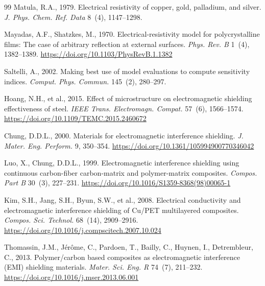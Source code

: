 \documentclass[review,3p,authoryear]{elsarticle}
\begin{document}
\begin{thebibliography}{99}
Matula, R.A., 1979.
Electrical resistivity of copper, gold, palladium, and silver.
\textit{J. Phys. Chem. Ref. Data} 8~(4), 1147--1298.

Mayadas, A.F., Shatzkes, M., 1970.
Electrical-resistivity model for polycrystalline films: The case of arbitrary reflection at external surfaces.
\textit{Phys. Rev. B} 1~(4), 1382--1389.
\url{https://doi.org/10.1103/PhysRevB.1.1382}

Saltelli, A., 2002.
Making best use of model evaluations to compute sensitivity indices.
\textit{Comput. Phys. Commun.} 145~(2), 280--297.

Hoang, N.H., et al., 2015.
Effect of microstructure on electromagnetic shielding effectiveness of steel.
\textit{IEEE Trans. Electromagn. Compat.} 57~(6), 1566--1574.
\url{https://doi.org/10.1109/TEMC.2015.2460672}

Chung, D.D.L., 2000.
Materials for electromagnetic interference shielding.
\textit{J. Mater. Eng. Perform.} 9, 350--354.
\url{https://doi.org/10.1361/105994900770346042}

Luo, X., Chung, D.D.L., 1999.
Electromagnetic interference shielding using continuous carbon-fiber carbon-matrix and polymer-matrix composites.
\textit{Compos. Part B} 30~(3), 227--231.
\url{https://doi.org/10.1016/S1359-8368(98)00065-1}

Kim, S.H., Jang, S.H., Byun, S.W., et al., 2008.
Electrical conductivity and electromagnetic interference shielding of Cu/PET multilayered composites.
\textit{Compos. Sci. Technol.} 68~(14), 2909--2916.
\url{https://doi.org/10.1016/j.compscitech.2007.10.024}

Thomassin, J.M., J{\'e}r{\^o}me, C., Pardoen, T., Bailly, C., Huynen, I., Detrembleur, C., 2013.
Polymer/carbon based composites as electromagnetic interference (EMI) shielding materials.
\textit{Mater. Sci. Eng. R} 74~(7), 211--232.
\url{https://doi.org/10.1016/j.mser.2013.06.001}

\end{thebibliography}
\end{document}
